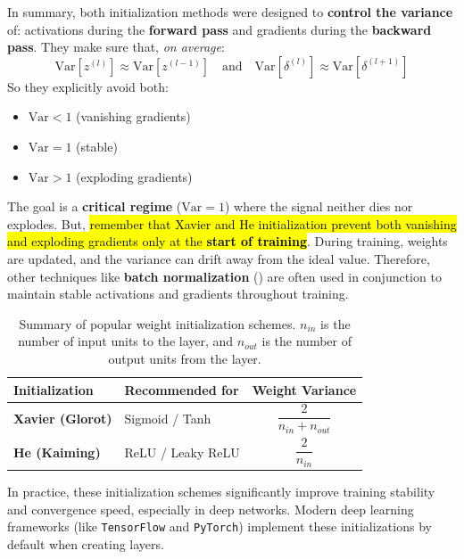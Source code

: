 In summary, both initialization methods were designed to \textbf{control the variance} of: activations during the \textbf{forward pass} and gradients during the \textbf{backward pass}. They make sure that, \emph{on average}:
\begin{equation*}
    \mathrm{Var}\left[z^{(l)}\right] \approx \mathrm{Var}\left[z^{(l-1)}\right] \quad \text{and} \quad \mathrm{Var}\left[\delta^{(l)}\right] \approx \mathrm{Var}\left[\delta^{(l+1)}\right]
\end{equation*}
So they explicitly avoid both:
\begin{itemize}
    \item[\textcolor{Red2}{\faIcon{times}}] $\mathrm{Var} < 1$ (vanishing gradients)
    \item[\textcolor{Green3}{\faIcon{check}}] $\mathrm{Var} = 1$ (stable)
    \item[\textcolor{Red2}{\faIcon{times}}] $\mathrm{Var} > 1$ (exploding gradients)
\end{itemize}
The goal is a \textbf{critical regime} ($\mathrm{Var} = 1$) where the signal neither dies nor explodes. But, \hl{remember that Xavier and He initialization prevent both vanishing and exploding gradients only at the \textbf{start of training}}. During training, weights are updated, and the variance can drift away from the ideal value. Therefore, other techniques like \textbf{batch normalization} () are often used in conjunction to maintain stable activations and gradients throughout training.

\begin{table}[!htp]
    \centering
    \begin{tabular}{@{} l l c @{}}
        \toprule
        Initialization & Recommended for & Weight Variance \\
        \midrule
        \textbf{Xavier (Glorot)} & Sigmoid / Tanh & $\dfrac{2}{n_{in} + n_{out}}$ \\[1.4em]
        \textbf{He (Kaiming)} & ReLU / Leaky ReLU & $\dfrac{2}{n_{in}}$ \\
        \bottomrule
    \end{tabular}
    \caption{Summary of popular weight initialization schemes. $n_{in}$ is the number of input units to the layer, and $n_{out}$ is the number of output units from the layer.}
\end{table}

\noindent
In practice, these initialization schemes significantly improve training stability and convergence speed, especially in deep networks. Modern deep learning frameworks (like \texttt{TensorFlow} and \texttt{PyTorch}) implement these initializations by default when creating layers.